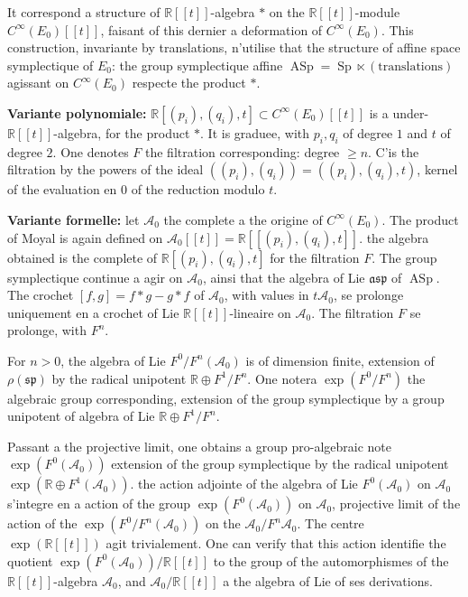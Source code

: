 \documentclass[11pt,a4paper]{article}
\theoremstyle{plain}
\theoremstyle{definition}
\DeclareMathOperator{\Sp}{Sp}
\DeclareMathOperator{\ASp}{ASp}
\newcommand{\R}{\mathbb{R}}
\begin{document}
It correspond a structure of $\R[[t]]$-algebra $*$ on the $\R[[t]]$-module $C^{\infty}(E_{0})[[t]]$,
faisant of this dernier a deformation of $C^{\infty}(E_{0})$. This construction, invariante
by translations, n'utilise that the structure of affine space symplectique of $E_{0}$: the
group symplectique affine $\ASp = \Sp \ltimes (\text{translations})$ agissant on $C^{\infty}(E_{0})$ respecte
the product $*$.

\textbf{Variante polynomiale:} $\R[(p_{i}),(q_{i}),t] \subset C^{\infty}(E_{0})[[t]]$ is a under-$\R[[t]]$-algebra,
for the product $*$. It is graduee, with $p_{i}, q_{i}$ of degree $1$ and $t$ of degree $2$. One denotes
$F$ the filtration corresponding: degree $\geq n$. C'is the filtration by the powers of
the ideal $((p_{i}),(q_{i})) = ((p_{i}),(q_{i}),t)$, kernel of the evaluation en $0$ of the reduction modulo $t$.

\textbf{Variante formelle:} let $\mathcal{A}_{0}$ the complete a the origine of $C^{\infty}(E_{0})$. The product of
Moyal is again defined on $\mathcal{A}_{0}[[t]] = \R[[(p_{i}),(q_{i}),t]]$. the algebra obtained is the
complete of $\R[(p_{i}),(q_{i}),t]$ for the filtration $F$. The group symplectique continue a
agir on $\mathcal{A}_{0}$, ainsi that the algebra of Lie $\mathfrak{asp}$ of $\ASp$. The crochet $[f,g] = f * g - g * f$ of
$\mathcal{A}_{0}$, with values in $t\mathcal{A}_{0}$, se prolonge uniquement en a crochet of Lie $\R[[t]]$-lineaire
on $\mathcal{A}_{0}$. The filtration $F$ se prolonge, with $F^{n}$.

For $n > 0$, the algebra of Lie $F^{0}/F^{n}(\mathcal{A}_{0})$ is of dimension finite, extension of $\rho(\mathfrak{sp})$ by the radical unipotent $\R \oplus F^{1}/F^{n}$. One notera $\exp(F^{0}/F^{n})$ the algebraic group corresponding, extension of the group symplectique by a group unipotent of algebra of Lie $\R \oplus F^{1}/F^{n}$.

Passant a the projective limit, one obtains a group pro-algebraic note
$\exp(F^{0}(\mathcal{A}_{0}))$ extension of the group symplectique by the radical unipotent $\exp(\R \oplus F^{1}(\mathcal{A}_{0}))$. the action adjointe of the algebra of Lie $F^{0}(\mathcal{A}_{0})$ on $\mathcal{A}_{0}$ s'integre en a action of the group $\exp(F^{0}(\mathcal{A}_{0}))$ on $\mathcal{A}_{0}$, projective limit of the action
of the $\exp(F^{0}/F^{n}(\mathcal{A}_{0}))$ on the $\mathcal{A}_{0}/F^{n}\mathcal{A}_{0}$. The centre $\exp(\R[[t]])$ agit trivialement. One can verify that this action identifie the quotient $\exp(F^{0}(\mathcal{A}_{0}))/\R[[t]]$ to the group of the automorphismes of the $\R[[t]]$-algebra $\mathcal{A}_{0}$, and $\mathcal{A}_{0}/\R[[t]]$ a the algebra of Lie of ses derivations.
\end{document}
